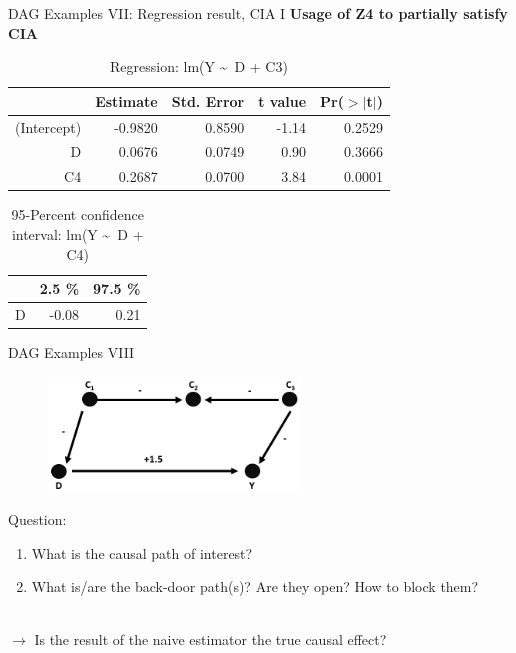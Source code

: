 \documentclass{beamer}\usepackage[]{graphicx}\usepackage[]{color}
\begin{document}
\begin{frame}[fragile]{DAG Examples VII: Regression result, CIA I}
\textbf{Usage of Z4 to partially satisfy CIA}
\begin{table}[ht]
\centering
\begingroup\small
\begin{tabular}{rrrrr}
  \hline
 & Estimate & Std. Error & t value & Pr($>$$|$t$|$) \\ 
  \hline
(Intercept) & -0.9820 & 0.8590 & -1.14 & 0.2529 \\ 
  D & 0.0676 & 0.0749 & 0.90 & 0.3666 \\ 
  C4 & 0.2687 & 0.0700 & 3.84 & 0.0001 \\ 
   \hline
\end{tabular}
\endgroup
\caption{Regression: lm(Y \textasciitilde ~D + C3)} 
\end{table}
\begin{table}[ht]
\centering
\begingroup\small
\begin{tabular}{rrr}
  \hline
 & 2.5 \% & 97.5 \% \\ 
  \hline
D & -0.08 & 0.21 \\ 
   \hline
\end{tabular}
\endgroup
\caption{95-Percent confidence interval: lm(Y \textasciitilde ~D + C4)} 
\end{table}

\end{frame}



\begin{frame}{DAG Examples VIII}
\\[1em]
\begin{figure}
\centering
\includegraphics[width=0.6\textwidth]{Graphics/7.Collider.png}
\end{figure}
Question:
\begin{enumerate}
\item What is the causal path of interest?
\item What is/are the back-door path(s)? Are they open? How to block them?
\end{enumerate}
\\[1em]
$\rightarrow$ Is the result of the naive estimator the true causal effect?
\end{frame}
\end{document}
